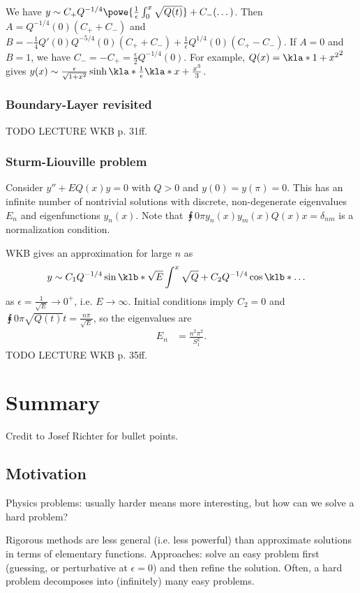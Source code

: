 \documentclass[english, parskip=full]{scrbook}
\newcommand{\example}[3]{\begin{tcolorbox}[colback=colorbackgroundexample,colframe=colorexample, breakable,enhanced,title={\textbf{#1}: #2.}]#3\end{tcolorbox}}
\begin{document}
\example{Initial-value problem}{$\epsilon^2y''=Q(x)y$ with $y(0)=A$ and $y'(0)=B$}{
We have $y\sim C_+ Q^{-1/4} \powe{\frac{1}{\epsilon}\int_0^x \sqrt{Q(t)}} + C_- (\dots)$.
Then $A=Q^{-1/4}(0)(C_++C_-)$ and $B=-\frac{1}{4} Q'(0) Q^{-5/4}(0) (C_++C_-) + \frac{1}{\epsilon} Q^{1/4}(0) (C_+-C_-)$.
If $A=0$ and $B=1$, we have $C_-=-C_+=\frac{\epsilon}{2}Q^{-1/4}(0)$.
For example, $Q(x)=\kla*{1+x^2}^2$ gives $y(x)\sim \frac{\epsilon}{\sqrt{1+x^2}} \sinh\kla*{\frac{1}{\epsilon} \kla*{x + \frac{x^3}{3}}}$.
}
\subsection{Boundary-Layer revisited}
TODO LECTURE WKB p. 31ff.
\subsection{Sturm-Liouville problem}
Consider $y''+EQ(x)y=0$ with $Q>0$ and $y(0)=y(\pi)=0$.
This has an infinite number of nontrivial solutions with discrete, non-degenerate eigenvalues $E_n$ and eigenfunctions $y_n(x)$.
Note that $\intx{0}{\pi}{y_n(x)y_m(x)Q(x)}{x}=\delta_{nm}$ is a normalization condition.

WKB gives an approximation for large $n$ as
\begin{align}
y &\sim C_1 Q^{-1/4} \sin \klb*{\sqrt{E} \int^x \sqrt{Q}} + C_2 Q^{-1/4} \cos \klb*{\dots}
\end{align}
as $\epsilon=\frac{1}{\sqrt{E}}\rightarrow 0^+$, i.e. $E\rightarrow \infty$.
Initial conditions imply $C_2=0$ and $\intx{0}{\pi}{\sqrt{Q(t)}}{t} = \frac{n\pi}{\sqrt{E}}$, so the eigenvalues are
\begin{align}
E_n &= \frac{n^2\pi^2}{S_1^2}.
\end{align}
TODO LECTURE WKB p. 35ff.


\chapter{Summary}
Credit to Josef Richter for bullet points.
\section{Motivation}
Physics problems: usually harder means more interesting, but how can we solve a hard problem?

Rigorous methods are less general (i.e. less powerful) than approximate solutions in terms of elementary functions.
Approaches: solve an easy problem first (guessing, or perturbative at $\epsilon=0$) and then refine the solution.
Often, a hard problem decomposes into (infinitely) many easy problems.
\end{document}
